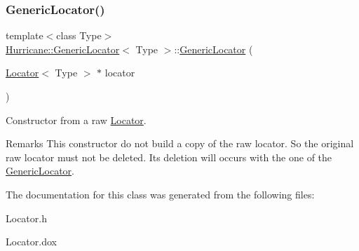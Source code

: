 \subsubsection{\texorpdfstring{Generic\+Locator()}{GenericLocator()}\hspace{0.1cm}{\footnotesize\ttfamily [3/3]}}
{\footnotesize\ttfamily template$<$class Type$>$ \\
\mbox{\hyperlink{classHurricane_1_1GenericLocator}{Hurricane\+::\+Generic\+Locator}}$<$ Type $>$\+::\mbox{\hyperlink{classHurricane_1_1GenericLocator}{Generic\+Locator}} (\begin{DoxyParamCaption}\item[{\mbox{\hyperlink{classHurricane_1_1Locator}{Locator}}$<$ Type $>$ $\ast$}]{locator }\end{DoxyParamCaption})\hspace{0.3cm}{\ttfamily [inline]}}

Constructor from a raw \mbox{\hyperlink{classHurricane_1_1Locator}{Locator}}.

\begin{DoxyRemark}{Remarks}
This constructor do not build a copy of the raw locator. So the original raw locator must not be deleted. It\textquotesingle{}s deletion will occurs with the one of the \mbox{\hyperlink{classHurricane_1_1GenericLocator}{Generic\+Locator}}. 
\end{DoxyRemark}


The documentation for this class was generated from the following files\+:\begin{DoxyCompactItemize}
\item 
Locator.\+h\item 
Locator.\+dox\end{DoxyCompactItemize}
